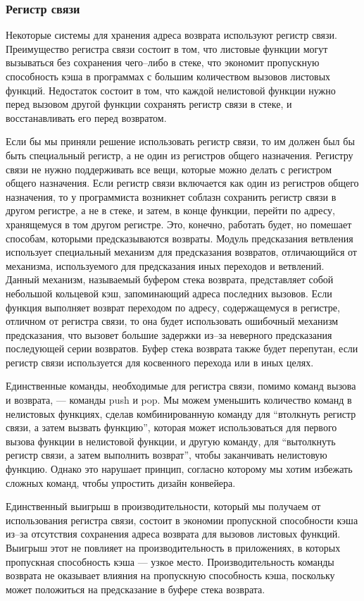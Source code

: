 \documentclass[forwardcom.tex]{subfiles}
\begin{document}
\subsubsection{Регистр связи}
Некоторые системы для хранения адреса возврата используют регистр связи. Преимущество регистра связи состоит в том, что листовые функции могут вызываться без сохранения чего--либо в стеке, что экономит пропускную способность кэша в программах с большим количеством вызовов листовых функций. Недостаток состоит в том, что каждой нелистовой функции нужно перед вызовом другой функции сохранять регистр связи в стеке, и восстанавливать  его перед возвратом.

Если бы мы приняли решение использовать регистр связи, то им должен был бы быть специальный регистр, а не один из регистров общего назначения. Регистру связи не нужно поддерживать все вещи, которые можно делать с регистром общего назначения. Если регистр связи включается как один из регистров общего назначения, то у программиста возникнет соблазн сохранить регистр связи в другом регистре, а не в стеке, и затем, в конце функции, перейти по адресу, хранящемуся в том другом регистре. Это, конечно, работать будет, но помешает способам, которыми предсказываются возвраты. Модуль предсказания ветвления использует специальный механизм для предсказания возвратов, отличающийся от механизма, используемого для предсказания иных переходов и ветвлений. Данный механизм, называемый буфером стека возврата, представляет собой небольшой кольцевой кэш, запоминающий адреса последних вызовов. Если функция выполняет возврат переходом по адресу, содержащемуся в регистре, отличном от регистра связи, то она будет использовать ошибочный механизм предсказания, что вызовет большие задержки из--за неверного предсказания последующей серии возвратов. Буфер стека возврата также будет перепутан, если регистр связи используется для косвенного перехода или в иных целях.

Единственные команды, необходимые для регистра связи, помимо команд вызова и возврата, --- команды push и pop. Мы можем уменьшить количество команд в нелистовых функциях, сделав комбинированную команду для ``втолкнуть регистр связи, а затем вызвать функцию'', которая может использоваться для первого вызова функции в нелистовой функции, и другую команду, для ``вытолкнуть регистр связи, а затем выполнить возврат'', чтобы заканчивать нелистовую функцию. Однако это нарушает принцип, согласно которому мы хотим избежать сложных команд, чтобы упростить дизайн конвейера.

Единственный выигрыш в производительности, который мы получаем от использования регистра связи, состоит в экономии пропускной способности кэша из--за отсутствия сохранения адреса возврата для вызовов листовых функций.
Выигрыш этот не повлияет на производительность в приложениях, в которых пропускная способность кэша --- узкое место. Производительность команды возврата не оказывает влияния на пропускную способность кэша, поскольку может положиться на предсказание в буфере стека возврата.
\end{document}
